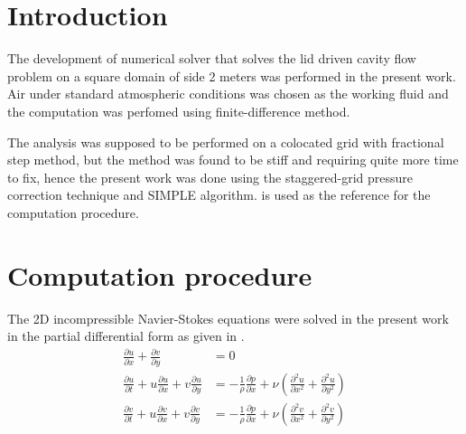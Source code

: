 \section{Introduction}
\par The development of numerical solver that solves the lid driven cavity
flow problem on a square domain of side 2 meters was performed in the present
work. Air under standard atmospheric conditions was chosen as the working
fluid and the computation was perfomed using finite-difference method.\\

\par The analysis was supposed to be performed on a colocated grid with
fractional step method, but the method was found to be stiff and requiring
quite more time to fix, hence the present work was done using the staggered-grid
pressure correction technique and SIMPLE algorithm. \cite{ref_1} is used as the
reference for the computation procedure.

\section{Computation procedure}
\par The 2D incompressible Navier-Stokes equations were solved in the present
work in the partial differential form as given in .
\begin{align}
    \frac{\partial u}{\partial x} + \frac{\partial v}{\partial y} &= 0 \label{ns_eqn1} \\
    \frac{\partial u}{\partial t} + u\frac{\partial u}{\partial x} + v\frac{\partial u}{\partial y} &= -\frac{1}{\rho}\frac{\partial p}{\partial x} + \nu \left(\frac{\partial^2 u}{\partial x^2} + \frac{\partial^2 u}{\partial y^2}\right) \label{ns_eqn2} \\
    \frac{\partial v}{\partial t} + u\frac{\partial v}{\partial x} + v\frac{\partial v}{\partial y} &= -\frac{1}{\rho}\frac{\partial p}{\partial x} + \nu \left(\frac{\partial^2 v}{\partial x^2} + \frac{\partial^2 v}{\partial y^2}\right) \label{ns_eqn3}
\end{align}


